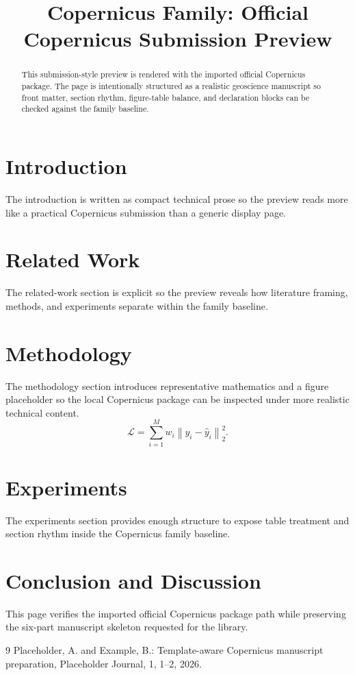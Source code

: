 \documentclass[os,manuscript]{copernicus}
\begin{document}
\title{Copernicus Family: Official Copernicus Submission Preview}
\begin{abstract}
This submission-style preview is rendered with the imported official Copernicus package. The page is intentionally structured as a realistic geoscience manuscript so front matter, section rhythm, figure-table balance, and declaration blocks can be checked against the family baseline.
\end{abstract}
\section{Introduction}
The introduction is written as compact technical prose so the preview reads more like a practical Copernicus submission than a generic display page.
\section{Related Work}
The related-work section is explicit so the preview reveals how literature framing, methods, and experiments separate within the family baseline.
\section{Methodology}
The methodology section introduces representative mathematics and a figure placeholder so the local Copernicus package can be inspected under more realistic technical content.
\begin{equation}
\mathcal{L} = \sum_{i=1}^{M} w_i \left\| y_i - \hat{y}_i \right\|_2^2.
\end{equation}
\section{Experiments}
The experiments section provides enough structure to expose table treatment and section rhythm inside the Copernicus family baseline.
\section{Conclusion and Discussion}
This page verifies the imported official Copernicus package path while preserving the six-part manuscript skeleton requested for the library.
\begin{thebibliography}{9}
 Placeholder, A. and Example, B.: Template-aware Copernicus manuscript preparation, Placeholder Journal, 1, 1--2, 2026.
\end{thebibliography}
\end{document}
